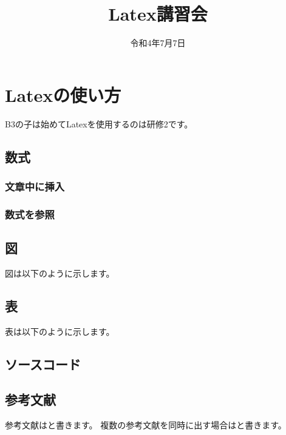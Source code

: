 \documentclass[a4paper,oneside,twocolumn,notitlepage,dvipdfmx]{jsarticle}
\date{令和4年7月7日}
\title{Latex講習会}
\begin{document}
\maketitle
\section{Latexの使い方}
B3の子は始めてLatexを使用するのは研修2です。\par
\subsection{数式}
\subsubsection{文章中に挿入}

\subsubsection{数式を参照}

\subsection{図}
図は以下のように示します。\par

\subsection{表}
表は以下のように示します。\par

\subsection{ソースコード}

\subsection{参考文献}
参考文献は\cite{florida}と書きます。
複数の参考文献を同時に出す場合は\cite{florida,meinronbun}と書きます。


\end{document}
